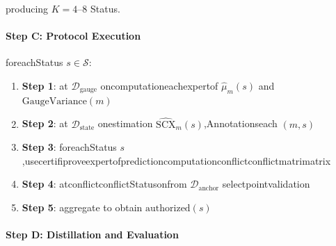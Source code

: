 \documentclass[
  12pt,
]{article}
\providecommand{\tightlist}{%
  \setlength{\itemsep}{0pt}\setlength{\parskip}{0pt}}
\begin{document}
producing \(K = 4\text{--}8\)  Status.

\paragraph{Step C: Protocol Execution}\label{step-c-protocol-ux8fd0ux884c}

foreachStatus \(s \in \mathcal{S}\):

\begin{enumerate}
\def\labelenumi{\arabic{enumi}.}
\tightlist
\item
  \textbf{Step 1}: at \(\mathcal{D}_{\text{gauge}}\) oncomputationeachexpertof
  \(\hat{\mu}_m(s)\) and \(\text{GaugeVariance}(m)\)
\item
  \textbf{Step 2}: at \(\mathcal{D}_{\text{state}}\) onestimation
  \(\widehat{\text{SCX}}_m(s)\),Annotationseach \((m, s)\)
\item
  \textbf{Step 3}: foreachStatus \(s\),usecertifiproveexpertofpredictioncomputationconflictconflictmatrimatrix
\item
  \textbf{Step 4}: atconflictconflictStatusonfrom \(\mathcal{D}_{\text{anchor}}\)
  selectpointvalidation
\item
  \textbf{Step 5}: aggregate to obtain \(\text{authorized}(s)\)
\end{enumerate}

\paragraph{Step D:
Distillation and Evaluation}\label{step-d-ux84b8ux998fux4e0eux8bc4ux4f30}
\end{document}
